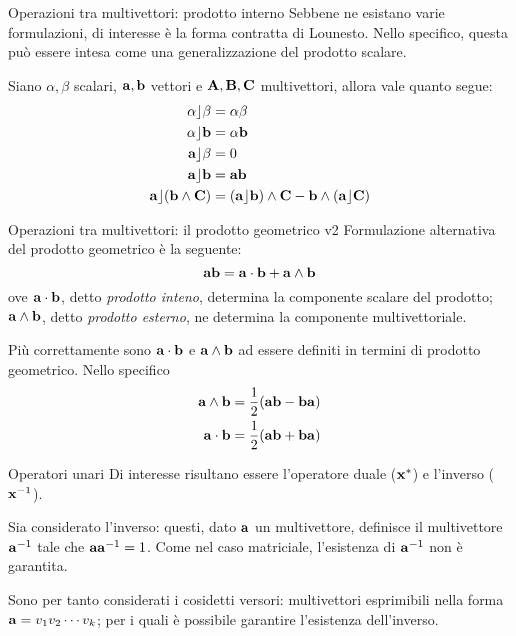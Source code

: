 \begin{frame}{Operazioni tra multivettori: prodotto interno}
    Sebbene ne esistano varie formulazioni, 
    di interesse è la forma contratta di Lounesto. 
    Nello specifico, questa può essere intesa come una generalizzazione del 
    prodotto scalare. 

    Siano \(\alpha, \beta\) scalari, \(\mathbf{a}, \mathbf{b}\) vettori e \(\mathbf{A}, 
    \mathbf{B}, \mathbf{C}\) multivettori, allora vale quanto segue:
    \[\begin{aligned}
        \alpha \rfloor \beta & = \alpha\beta \\
        \alpha \rfloor \mathbf{b} & = \alpha\mathbf{b} \\ 
        \mathbf{a} \rfloor \beta & = 0 \\ 
        \mathbf{a} \rfloor \mathbf{b} & = \mathbf{ab} \\ 
        \mathbf{a} \rfloor (\mathbf{b} \wedge \mathbf{C}) & = 
            (\mathbf{a} \rfloor \mathbf{b}) \wedge \mathbf{C} - \mathbf{b} \wedge (\mathbf{a} \rfloor \mathbf{C})
    \end{aligned}\]
\end{frame}
\begin{frame}{Operazioni tra multivettori: il prodotto geometrico v2}
    Formulazione alternativa del prodotto geometrico è la seguente:
    \[
        \mathbf{ab} = \mathbf{a} \cdot \mathbf{b} + \mathbf{a} \wedge \mathbf{b}
    \]
    ove \(\mathbf{a} \cdot \mathbf{b}\), detto \emph{prodotto inteno},
    determina la componente scalare del prodotto; 
    \(\mathbf{a} \wedge \mathbf{b}\), detto \emph{prodotto esterno},
    ne determina la componente multivettoriale.

    Più correttamente sono \(\mathbf{a} \cdot \mathbf{b}\) e \(\mathbf{a} \wedge \mathbf{b}\)
    ad essere definiti in termini di prodotto geometrico. 
    Nello specifico
    \[\begin{aligned}
        \mathbf{a} \wedge \mathbf{b} = \frac{1}{2}(\mathbf{ab} - \mathbf{ba}) \\ 
        \mathbf{a} \cdot \mathbf{b} = \frac{1}{2}(\mathbf{ab} + \mathbf{ba})
    \end{aligned}\]
\end{frame}
\begin{frame}{Operatori unari}
    Di interesse risultano essere l'operatore duale (\(\mathbf{x}^{*}\))
    e l'inverso (\(\mathbf{x}^{-1}\)).

    Sia considerato l'inverso: questi, dato \(\mathbf{a}\) un multivettore,
    definisce il multivettore \(\mathbf{a}^{-1}\) tale che \(\mathbf{a}\mathbf{a}^{-1} = 1\).
    Come nel caso matriciale, l'esistenza di \(\mathbf{a}^{-1}\) non è garantita.

    Sono per tanto considerati i cosidetti versori: 
    multivettori esprimibili nella forma \(\mathbf{a} = v_{1}v_{2}\cdots v_{k}\);
    per i quali è possibile garantire l'esistenza dell'inverso.
\end{frame}
